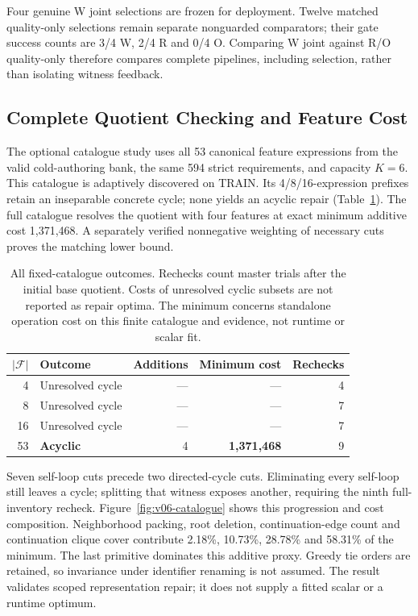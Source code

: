 Four genuine W joint selections are frozen for deployment. Twelve matched
quality-only selections remain separate nonguarded comparators; their gate
success counts are 3/4 W, 2/4 R and 0/4 O. Comparing W joint against R/O
quality-only therefore compares complete pipelines, including selection,
rather than isolating witness feedback.

\subsection{Complete Quotient Checking and Feature Cost}
The optional catalogue study uses all 53 canonical feature expressions from
the valid cold-authoring bank, the same 594 strict requirements, and capacity
$K=6$. This catalogue is adaptively discovered on TRAIN. Its 4/8/16-expression
prefixes retain an inseparable concrete cycle; none yields an acyclic repair
(Table~\ref{tab:v06-catalogue}). The full catalogue resolves the quotient with
four features at exact minimum additive cost 1,371,468. A separately verified
nonnegative weighting of necessary cuts proves the matching lower bound.

\begin{table}[t]
\centering
\fontsize{9}{10.4}\selectfont
\setlength{\tabcolsep}{4pt}
\caption{All fixed-catalogue outcomes. Rechecks count master trials after
the initial base quotient. Costs of unresolved cyclic subsets are not
reported as repair optima. The minimum concerns standalone operation cost
on this finite catalogue and evidence, not runtime or scalar fit.}
\label{tab:v06-catalogue}
\begin{tabular}{rlrrr}
\toprule
$|\mathcal F|$ & Outcome & Additions & Minimum cost & Rechecks\\
\midrule
4 & Unresolved cycle & --- & --- & 4\\
8 & Unresolved cycle & --- & --- & 7\\
16 & Unresolved cycle & --- & --- & 7\\
53 & \textbf{Acyclic} & 4 & \textbf{1,371,468} & 9\\
\bottomrule
\end{tabular}
\end{table}

Seven self-loop cuts precede two directed-cycle cuts. Eliminating every
self-loop still leaves a cycle; splitting that witness exposes another,
requiring the ninth full-inventory recheck. Figure~\ref{fig:v06-catalogue}
shows this progression and cost composition. Neighborhood packing, root
deletion, continuation-edge count and continuation clique cover contribute
2.18\%, 10.73\%, 28.78\% and 58.31\% of the minimum. The last primitive
dominates this additive proxy. Greedy tie orders are retained, so invariance
under identifier renaming is not assumed. The result validates scoped
representation repair; it does not supply a fitted scalar or a runtime optimum.

